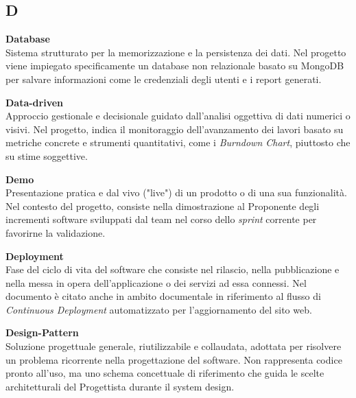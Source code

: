 \documentclass[12pt, a4paper]{article}
\begin{document}
\newpage
\subsection*{D}
{}
\vspace{0.2cm}

\noindent\hypertarget{database}{\textbf{Database}} \\[0.1em]
Sistema strutturato per la memorizzazione e la persistenza dei dati. Nel progetto viene impiegato specificamente un database non relazionale basato su MongoDB per salvare informazioni come le credenziali degli utenti e i report generati.
\vspace{0.5cm}  

\noindent\hypertarget{data-driven}{\textbf{Data-driven}} \\[0.1em]
Approccio gestionale e decisionale guidato dall'analisi oggettiva di dati numerici o visivi. Nel progetto, indica il monitoraggio dell'avanzamento dei lavori basato su metriche concrete e strumenti quantitativi, come i \textit{Burndown Chart}, piuttosto che su stime soggettive.
\vspace{0.5cm}

\noindent\hypertarget{demo}{\textbf{Demo}} \\[0.1em]
Presentazione pratica e dal vivo ("live") di un prodotto o di una sua funzionalità. Nel contesto del progetto, consiste nella dimostrazione al Proponente degli incrementi software sviluppati dal team nel corso dello \textit{sprint} corrente per favorirne la validazione.
\vspace{0.5cm}  

\noindent\hypertarget{deployment}{\textbf{Deployment}} \\[0.1em]
Fase del ciclo di vita del software che consiste nel rilascio, nella pubblicazione e nella messa in opera dell'applicazione o dei servizi ad essa connessi. Nel documento è citato anche in ambito documentale in riferimento al flusso di \textit{Continuous Deployment} automatizzato per l'aggiornamento del sito web.
\vspace{0.5cm}  

\noindent\hypertarget{design-pattern}{\textbf{Design-Pattern}} \\[0.1em]
Soluzione progettuale generale, riutilizzabile e collaudata, adottata per risolvere un problema ricorrente nella progettazione del software. Non rappresenta codice pronto all’uso, ma uno schema concettuale di riferimento che guida le scelte architetturali del Progettista durante il system design.
\vspace{0.5cm}
\end{document}
